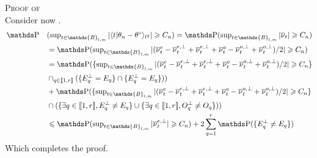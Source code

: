 \begin{pro}{\textsc{Proof of }\\}
Consider now .
\begin{alignat*}{2}
&\P&&(\sup\nolimits_{t \in \mathds{B}_{l, m}} \vert \langle t \vert \theta_{n} - \theta^{\circ}\rangle_{l^{2}} \vert \geq C_{n}) =\P(\sup\nolimits_{t \in \mathds{B}_{l, m}} \vert \overline{\nu}_{t} \vert \geq C_{n})\notag\\
& && = \P(\sup\nolimits_{t \in \mathds{B}_{l, m}} \vert (\overline{\nu}_{t}^{e} - \overline{\nu}_{t}^{e, \perp} + \overline{\nu}_{t}^{e, \perp} + \overline{\nu}_{t}^{o} - \overline{\nu}_{t}^{o, \perp} + \overline{\nu}_{t}^{o, \perp})/2 \vert \geq C_{n})\notag\\
& && = \P(\{\sup\nolimits_{t \in \mathds{B}_{l, m}} \vert (\overline{\nu}_{t}^{e} - \overline{\nu}_{t}^{e, \perp} + \overline{\nu}_{t}^{e, \perp} + \overline{\nu}_{t}^{o} - \overline{\nu}_{t}^{o, \perp} + \overline{\nu}_{t}^{o, \perp} )/2 \vert \geq C_{n}\}\\
& &&\cap_{q \in \llbracket 1, r \rrbracket} (\{ E_{q}^{\perp} = E_{q} \} \cap \{ E_{q}^{\perp} = E_{q} \})) \notag\\
& && + \P(\{\sup\nolimits_{t \in \mathds{B}_{l, m}} \vert (\overline{\nu}_{t}^{e} - \overline{\nu}_{t}^{e, \perp} + \overline{\nu}_{t}^{e, \perp} + \overline{\nu}_{t}^{o} - \overline{\nu}_{t}^{o, \perp} + \overline{\nu}_{t}^{o, \perp} )/2 \vert \geq C_{n}\}\\
& && \cap (\{ \exists q \in \llbracket 1, r \rrbracket, E_{q}^{\perp} \neq E_{q} \}\cup \{ \exists q \in \llbracket 1, r \rrbracket, O_{q}^{\perp} \neq O_{q} \}))\notag\\
& &&\leq\P(\sup\nolimits_{t \in \mathds{B}_{l, m}} \vert \overline{\nu}_{t}^{e, \perp} \vert \geq C_{n}) + 2\sum_{q = 1}^{r}\P(\{E_{q}^{\perp} \neq E_{q}\})
\end{alignat*}
Which completes the proof.
\proEnd
\end{pro}

